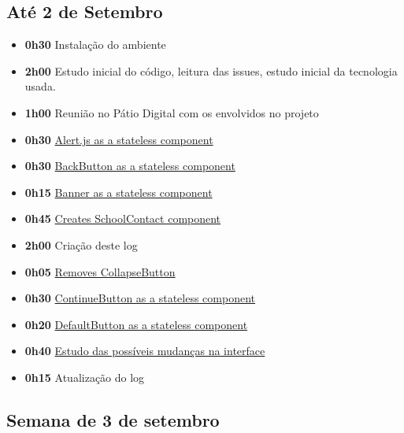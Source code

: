 \hypertarget{atuxe9-2-de-setembro}{%
\subsection{Até 2 de Setembro}\label{atuxe9-2-de-setembro}}

\begin{itemize}
\tightlist
\item
  \textbf{0h30} Instalação do ambiente
\item
  \textbf{2h00} Estudo inicial do código, leitura das issues, estudo
  inicial da tecnologia usada.
\item
  \textbf{1h00} Reunião no Pátio Digital com os envolvidos no projeto
\item
  \textbf{0h30}
  \href{https://github.com/prefeiturasp/SME-FilaDaCreche/pull/13}{Alert.js
  as a stateless component}
\item
  \textbf{0h30}
  \href{https://github.com/prefeiturasp/SME-FilaDaCreche/pull/14}{BackButton
  as a stateless component}
\item
  \textbf{0h15}
  \href{https://github.com/prefeiturasp/SME-FilaDaCreche/pull/15}{Banner
  as a stateless component}
\item
  \textbf{0h45}
  \href{https://github.com/prefeiturasp/SME-FilaDaCreche/pull/16}{Creates
  SchoolContact component}
\item
  \textbf{2h00} Criação deste log
\item
  \textbf{0h05}
  \href{https://github.com/prefeiturasp/SME-FilaDaCreche/pull/24}{Removes
  CollapseButton}
\item
  \textbf{0h30}
  \href{https://github.com/prefeiturasp/SME-FilaDaCreche/pull/25}{ContinueButton
  as a stateless component}
\item
  \textbf{0h20}
  \href{https://github.com/prefeiturasp/SME-FilaDaCreche/pull/26}{DefaultButton
  as a stateless component}
\item
  \textbf{0h40}
  \href{https://github.com/prefeiturasp/SME-FilaDaCreche/issues/27}{Estudo
  das possíveis mudanças na interface}
\item
  \textbf{0h15} Atualização do log
\end{itemize}

\hypertarget{semana-de-3-de-setembro}{%
\subsection{Semana de 3 de setembro}\label{semana-de-3-de-setembro}}

